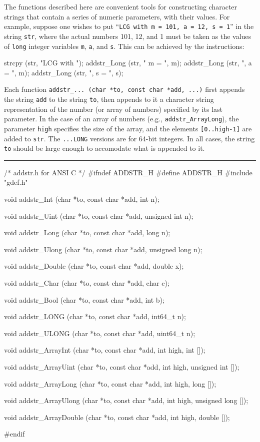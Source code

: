 
The functions described here are convenient tools for constructing
character strings that contain a series of numeric parameters,
with their values.
For example, suppose one wishes to put
``{\tt LCG with m = 101, a = 12, s = 1}'' in the string {\tt str},
where the actual
numbers 101, 12, and 1 must be taken as the values of {\tt long}
integer variables {\tt m}, {\tt a}, and {\tt s}.
This can be achieved by the instructions:
\vcode

   strcpy (str, "LCG with ");
   addstr\_Long (str, " m = ", m);
   addstr\_Long (str, ", a = ", m);
   addstr\_Long (str, ", s = ", s);
\endvcode

Each function {\tt addstr\_... (char *to, const char *add, ...)}
first appends the string {\tt add} to the string {\tt to}, then
appends to it a character string representation of the number
(or array of numbers) specified by its last parameter.
In the case of an array of numbers (e.g., {\tt addstr\_ArrayLong}),
the parameter {\tt high} specifies the size of the array, and the
elements {\tt [0..high-1]} are added to {\tt str}.
The {\tt ...LONG} versions are for 64-bit integers.
In all cases, the string {\tt to} should be large enough to accomodate
what is appended to it.


\bigskip\hrule
\code\hide
/*  addstr.h  for ANSI C  */
#ifndef ADDSTR_H
#define ADDSTR_H
\endhide
#include "gdef.h"
\endcode

\code

void  addstr_Int (char *to, const char *add, int n);

void  addstr_Uint (char *to, const char *add, unsigned int n);

void  addstr_Long (char *to, const char *add, long n);

void  addstr_Ulong (char *to, const char *add, unsigned long n);

void  addstr_Double (char *to, const char *add, double x);

void  addstr_Char (char *to, const char *add, char c);

void  addstr_Bool (char *to, const char *add, int b);
\endcode
\code

void  addstr_LONG (char *to, const char *add, int64_t n);

void  addstr_ULONG (char *to, const char *add, uint64_t n);
\endcode
\code

void  addstr_ArrayInt (char *to, const char *add, int high, int []);

void  addstr_ArrayUint (char *to, const char *add, int high,
                        unsigned int []);

void  addstr_ArrayLong (char *to, const char *add, int high, long []);

void  addstr_ArrayUlong (char *to, const char *add, int high,
                         unsigned long []);

void  addstr_ArrayDouble (char *to, const char *add, int high, double []);

\hide
#endif
\endhide
\endcode

